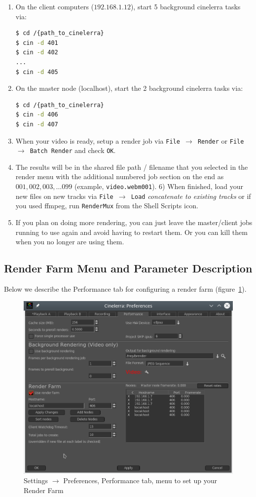 \begin{enumerate}
    \item On the client computers ($192.168.1.12$), start 5 background cinelerra tasks via:
    \begin{lstlisting}[language=bash]
$ cd /{path_to_cinelerra}
$ cin -d 401
$ cin -d 402 
...
$ cin -d 405
    \end{lstlisting}
    \item On the master node (localhost), start the 2 background cinelerra tasks via:
    \begin{lstlisting}[language=bash]
$ cd /{path_to_cinelerra}
$ cin -d 406
$ cin -d 407
    \end{lstlisting}
    \item When your video is ready, setup a render job via \texttt{File $\rightarrow$  Render} or \texttt{File $\rightarrow$  Batch Render} and check \texttt{OK}.
    \item The results will be in the shared file path / filename that you selected in the render menu with the
    additional numbered job section on the end as  $001, 002, 003, \dots 099$ (example, \texttt{video.webm001}).
    6) When finished, load your new files on new tracks via  \texttt{File  $\rightarrow$ Load} \textit{concatenate to existing tracks}  or if you used ffmpeg, run \texttt{RenderMux} from the Shell Scripts icon.
    \item If you plan on doing more rendering, you can just leave the master/client jobs running to use again
    and avoid having to restart them.  Or you can kill them when you no longer are using them.
\end{enumerate}

\subsection{Render Farm Menu and Parameter Description}%
\label{sub:render_farm_parameter_description}

Below we describe the Performance tab for configuring a render farm (figure~\ref{fig:farm}).

\begin{figure}[htpb]
    \centering
    \includegraphics[width=0.8\linewidth]{images/farm.png}
    \caption{Settings $\rightarrow$ Preferences, Performance tab, menu to set up your Render Farm}
    \label{fig:farm}
\end{figure}

